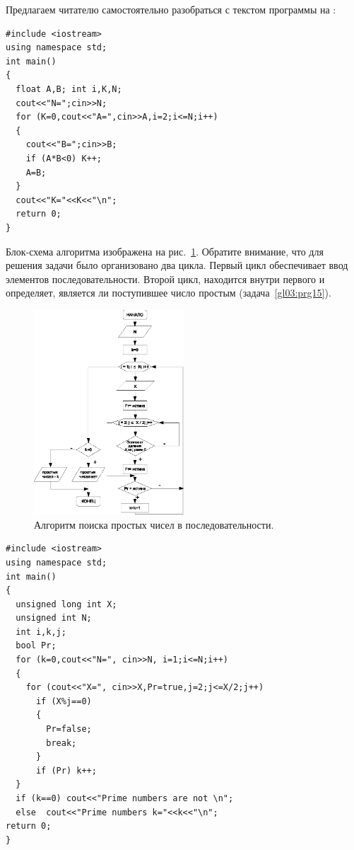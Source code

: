 Предлагаем читателю самостоятельно разобраться с текстом программы на : 
\begin{lstlisting}
#include <iostream>
using namespace std;
int main()
{
  float A,B; int i,K,N;
  cout<<"N=";cin>>N;
  for (K=0,cout<<"A=",cin>>A,i=2;i<=N;i++)
  {
    cout<<"B=";cin>>B;
    if (A*B<0) K++;
    A=B;
  }
  cout<<"K="<<K<<"\n";
  return 0;
}
\end{lstlisting}



Блок-схема алгоритма изображена на рис.~\ref{ch03:refDrawing36}. Обратите внимание, что для решения задачи было организовано два
цикла. Первый цикл обеспечивает ввод элементов последовательности. Второй цикл, находится внутри первого и определяет,
является ли поступившее число простым (задача~\ref{gl03:prg15}).

\begin{figure}[htb]
\begin{center}
\includegraphics[width=0.5\textwidth]{img/ris_3_37}
\caption{Алгоритм поиска простых чисел в последовательности.}
\label{ch03:refDrawing36}
\end{center}
\end{figure}

\begin{lstlisting}
#include <iostream>
using namespace std;
int main()
{
  unsigned long int X; 
  unsigned int N; 
  int i,k,j;
  bool Pr;
  for (k=0,cout<<"N=", cin>>N, i=1;i<=N;i++)
  {
    for (cout<<"X=", cin>>X,Pr=true,j=2;j<=X/2;j++)
      if (X%j==0) 
      {
        Pr=false;
        break;
      }
      if (Pr) k++;
  }
  if (k==0) cout<<"Prime numbers are not \n";
  else  cout<<"Prime numbers k="<<k<<"\n";
return 0;
}
\end{lstlisting}


